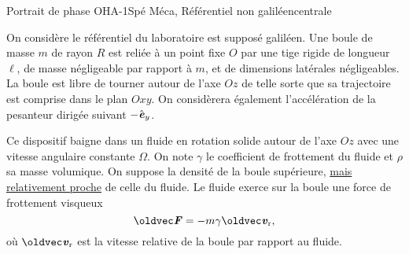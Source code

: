 \begin{exercise}{Portrait de phase OHA}{-1}{Spé}
{Méca, Référentiel non galiléen}{centrale}

On considère le référentiel du laboratoire est supposé galiléen. Une boule de masse $m$ de rayon $R$ est reliée à un point fixe $O$ par une tige rigide de longueur $\ell$, de masse négligeable par rapport à $m$, et de dimensions latérales négligeables. La boule est libre de tourner autour de l'axe $Oz$ de telle sorte que sa trajectoire est comprise dans le plan $Oxy$. On considèrera également l'accélération de la pesanteur dirigée suivant $-\hat{\bm{\mathit{e}}}_y$.

Ce dispositif baigne dans un fluide en rotation solide autour de l'axe $Oz$ avec une vitesse angulaire constante $\Omega$. On note $\gamma$ le coefficient de frottement du fluide et $\rho$ sa masse volumique. On suppose la densité de la boule supérieure, \underline{mais relativement proche} de celle du fluide. Le fluide exerce sur la boule une force de frottement visqueux
$$\vec{F} = -m\gamma\vv_\text{r},$$
où $\vv_\text{r}$ est la vitesse relative de la boule par rapport au fluide.

\begin{center}
\end{center}
\end{exercise}

